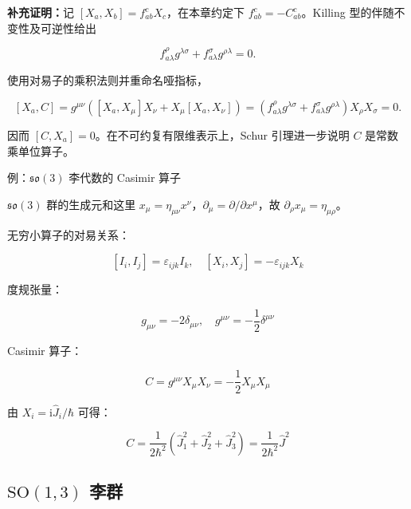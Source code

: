 \textbf{补充证明：}记 $\left[X_a,X_b\right]=f_{ab}^{c}X_c$，在本章约定下 $f_{ab}^{c}=-C_{ab}^{c}$。Killing 型的伴随不变性及可逆性给出

\begin{equation}
f_{a\lambda}^{\rho}g^{\lambda\sigma}+f_{a\lambda}^{\sigma}g^{\rho\lambda}=0.
\end{equation}

使用对易子的乘积法则并重命名哑指标，

\begin{equation}
\left[X_a,C\right]=g^{\mu\nu}\left(\left[X_a,X_\mu\right]X_\nu+X_\mu\left[X_a,X_\nu\right]\right)
=\left(f_{a\lambda}^{\rho}g^{\lambda\sigma}+f_{a\lambda}^{\sigma}g^{\rho\lambda}\right)X_\rho X_\sigma=0.
\end{equation}

因而 $\left[C,X_a\right]=0$。在不可约复有限维表示上，Schur 引理进一步说明 $C$ 是常数乘单位算子。

例：$\mathfrak{so}\left(3\right)$ 李代数的 Casimir 算子

$\mathfrak{so}\left(3\right)$ 群的生成元和这里 $x_\mu=\eta_{\mu\nu}x^\nu$，$\partial_\mu=\partial/\partial x^\mu$，故 $\partial_\rho x_\mu=\eta_{\mu\rho}$。

无穷小算子的对易关系：

\begin{equation}
\left[I_i,I_j \right]=\varepsilon_{ijk} I_k,\quad 
\left[X_i,X_j \right]=-\varepsilon_{ijk} X_k
\end{equation}

度规张量：

\begin{equation}
g_{\mu\nu} = -2\delta_{\mu\nu},\quad
g^{\mu\nu} = -\frac{1 }{2 } \delta^{\mu\nu}
\end{equation}

Casimir 算子：

\begin{equation}
C
=g^{\mu\nu} X_\mu X_\nu
=-\frac{1 }{2 } X_\mu X_\mu
\end{equation}

由 $X_i=\mathrm{i}\hat{J}_i/\hbar$ 可得：

\begin{equation}
C
=\frac{1}{2\hbar^2}\left(\hat{J}_1^2+\hat{J}_2^2+\hat{J}_3^2\right)
=\frac{1}{2\hbar^2}\hat{J}^2
\end{equation}

\subsection{\texorpdfstring{$\mathrm{SO}\left(1,3\right)$ 李群}{SO(1,3) 李群}}


